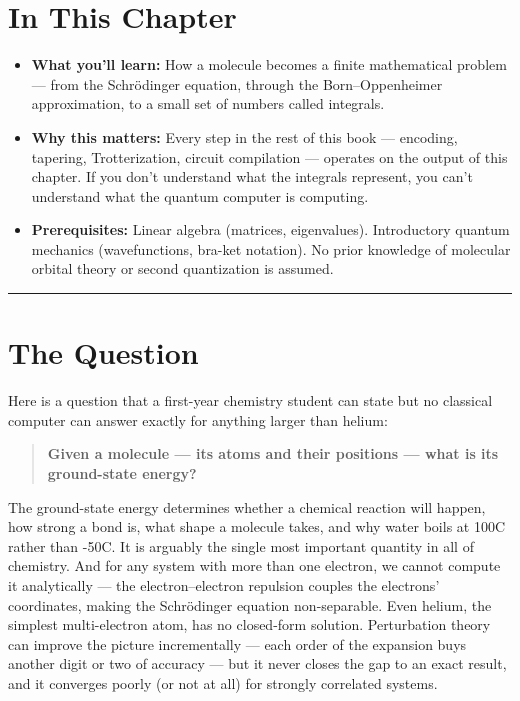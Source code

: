 \documentclass[
  11pt,
  oneside]{book}
\providecommand{\tightlist}{%
  \setlength{\itemsep}{0pt}\setlength{\parskip}{0pt}}
\begin{document}
\section{In This Chapter}\label{in-this-chapter}

\begin{itemize}
\tightlist
\item
  \textbf{What you'll learn:} How a molecule becomes a finite
  mathematical problem --- from the Schrödinger equation, through the
  Born--Oppenheimer approximation, to a small set of numbers called
  integrals.
\item
  \textbf{Why this matters:} Every step in the rest of this book ---
  encoding, tapering, Trotterization, circuit compilation --- operates
  on the output of this chapter. If you don't understand what the
  integrals represent, you can't understand what the quantum computer is
  computing.
\item
  \textbf{Prerequisites:} Linear algebra (matrices, eigenvalues).
  Introductory quantum mechanics (wavefunctions, bra-ket notation). No
  prior knowledge of molecular orbital theory or second quantization is
  assumed.
\end{itemize}

\begin{center}\rule{0.5\linewidth}{0.5pt}\end{center}

\section{The Question}\label{the-question}

Here is a question that a first-year chemistry student can state but no
classical computer can answer exactly for anything larger than helium:

\begin{quote}
\textbf{Given a molecule --- its atoms and their positions --- what is
its ground-state energy?}
\end{quote}

The ground-state energy determines whether a chemical reaction will
happen, how strong a bond is, what shape a molecule takes, and why water
boils at 100\textdegree{}C rather than -50\textdegree{}C. It is arguably the single most
important quantity in all of chemistry. And for any system with more
than one electron, we cannot compute it analytically --- the
electron--electron repulsion couples the electrons' coordinates, making
the Schrödinger equation non-separable. Even helium, the simplest
multi-electron atom, has no closed-form solution. Perturbation theory
can improve the picture incrementally --- each order of the expansion
buys another digit or two of accuracy --- but it never closes the gap to
an exact result, and it converges poorly (or not at all) for strongly
correlated systems.
\end{document}

